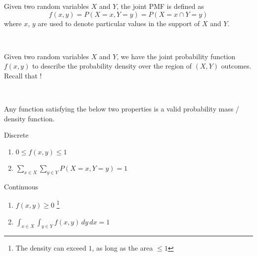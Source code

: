 \begin{definition}
    Given two  random variables $X$ and $Y$, the joint PMF is defined as $$f(x, y) = P(X = x, Y = y) = P(X = x \cap Y = y)$$ where $x$, $y$ are used to denote particular values in the support of $X$ and $Y$. 

    {~~~}

    Given two  random variables $X$ and $Y$, we have the joint probability function $f(x, y)$ to describe the probability density over the region of $(X, Y)$ outcomes. Recall that !

    {~~~}

    Any function satisfying the below two properties is a valid probability mass / density function.

    \begin{minipage}[t]{0.45\linewidth}
        \begin{center} Discrete \end{center}
        \begin{enumerate}
            \item $0 \le f(x, y) \le 1$
            \item $\sum_{x \in X} \sum_{y \in Y} P(X = x, Y = y) = 1$
        \end{enumerate}
    \end{minipage}
    \begin{minipage}[t]{0.45\linewidth}
        \begin{center} Continuous \end{center}
        \begin{enumerate}
            \item $f(x, y) \ge 0$ \footnote{The density can exceed $1$, as long as the area $\le 1$}
            \item $\int_{x \in X} \int_{y \in Y} f(x, y) \,dy \,dx = 1$
        \end{enumerate}
    \end{minipage}
\end{definition}

